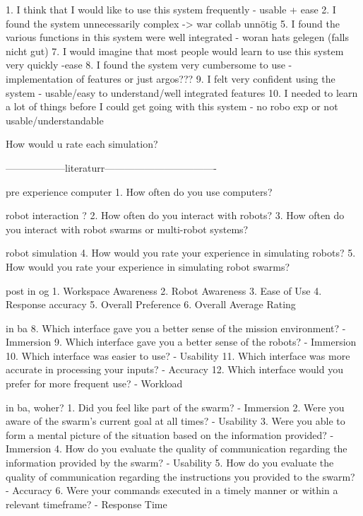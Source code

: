 \documentclass[german,version-2020-11]{uzl-thesis}
\begin{document}
\begin{Code}
        1. I think that I would like to use this system frequently - usable + ease
        2. I found the system unnecessarily complex -> war collab unnötig
        5. I found the various functions in this system were well integrated - woran hats gelegen (falls nicht gut)
        7. I would imagine that most people would learn to use this system very quickly -ease
        8. I found the system very cumbersome to use - implementation of features or just argos???
        9. I felt very confident using the system - usable/easy to understand/well integrated features
        10. I needed to learn a lot of things before I could get going with this system - no robo exp or not usable/understandable
      
        How would u rate each simulation?
      
      
      
        ------------------literaturr----------------------------------
      
          pre
            experience  
            computer
            1. How often do you use computers? 
      
            robot interaction ?
            2. How often do you interact with robots?
            3. How often do you interact with robot swarms or multi-robot systems? 
            
            robot simulation
            4. How would you rate your experience in simulating robots? 
            5. How would you rate your experience in simulating robot swarms? 
      
      
          post
            in og
            1. Workspace Awareness 
            2. Robot Awareness 
            3. Ease of Use 
            4. Response accuracy 
            5. Overall Preference 
            6. Overall Average Rating 
      
      
            in ba
            8. Which interface gave you a better sense of the mission environment? - Immersion
            9. Which interface gave you a better sense of the robots? - Immersion
            10. Which interface was easier to use? - Usability
            11. Which interface was more accurate in processing your inputs? - Accuracy
            12. Which interface would you prefer for more frequent use? - Workload
      
      
            in ba, woher?
              1. Did you feel like part of the swarm? - Immersion
              2. Were you aware of the swarm’s current goal at all times? - Usability
              3. Were you able to form a mental picture of the situation based on the information provided? - Immersion
              4. How do you evaluate the quality of communication regarding the information provided by the swarm? - Usability
              5. How do you evaluate the quality of communication regarding the instructions you provided to the swarm? - Accuracy
              6. Were your commands executed in a timely manner or within a relevant timeframe? - Response Time
            

\end{Code}
\end{document}
